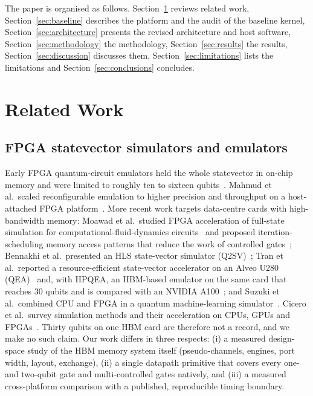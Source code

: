 \documentclass[pdflatex,sn-mathphys-num]{sn-jnl}
\theoremstyle{thmstyleone}
\theoremstyle{thmstylethree}
\begin{document}
The paper is organised as follows. Section~\ref{sec:related} reviews related work, Section~\ref{sec:baseline} describes the platform and the audit of the baseline kernel, Section~\ref{sec:architecture} presents the revised architecture and host software, Section~\ref{sec:methodology} the methodology, Section~\ref{sec:results} the results, Section~\ref{sec:discussion} discusses them, Section~\ref{sec:limitations} lists the limitations and Section~\ref{sec:conclusions} concludes.
\section{Related Work}\label{sec:related}

\subsection{FPGA statevector simulators and emulators}\label{subsec:related-fpga}

Early FPGA quantum-circuit emulators held the whole statevector in on-chip memory and were limited to roughly ten to sixteen qubits~\cite{khalid2004fpga,aminian2008fpga,lee2016fpga,pilch2019fpga}. Mahmud et al.\ scaled reconfigurable emulation to higher precision and throughput on a host-attached FPGA platform~\cite{mahmud2019scaling}. More recent work targets data-centre cards with high-bandwidth memory: Moawad et al.\ studied FPGA acceleration of full-state simulation for computational-fluid-dynamics circuits~\cite{moawad2022cfd} and proposed iteration-scheduling memory access patterns that reduce the work of controlled gates~\cite{moawad2024iteration}; Bennakhi et al.\ presented an HLS state-vector simulator (Q2SV)~\cite{bennakhi2025q2sv}; Tran et al.\ reported a resource-efficient state-vector accelerator on an Alveo U280 (QEA)~\cite{tran2025qea} and, with HPQEA, an HBM-based emulator on the same card that reaches 30 qubits and is compared with an NVIDIA A100~\cite{tran2025hpqea}; and Suzuki et al.\ combined CPU and FPGA in a quantum machine-learning simulator~\cite{suzuki2023hybrid}. Cicero et al.\ survey simulation methods and their acceleration on CPUs, GPUs and FPGAs~\cite{cicero2024review}. Thirty qubits on one HBM card are therefore not a record, and we make no such claim. Our work differs in three respects: (i) a measured design-space study of the HBM memory system itself (pseudo-channels, engines, port width, layout, exchange), (ii) a single datapath primitive that covers every one- and two-qubit gate and multi-controlled gates natively, and (iii) a measured cross-platform comparison with a published, reproducible timing boundary.
\end{document}
